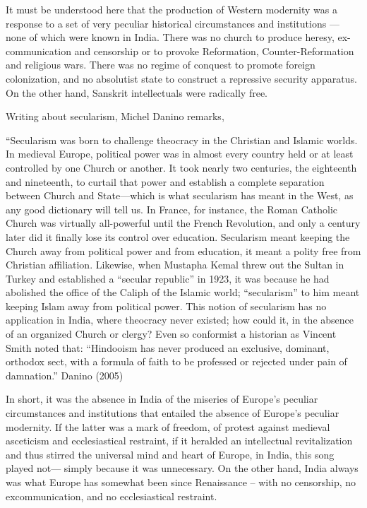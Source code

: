 It must be understood here that the production of Western modernity was a response to a set of very peculiar historical circumstances and institutions — none of which were known in India. There was no church to produce heresy, ex-communication and censorship or to provoke Reformation, Counter-Reformation and religious wars. There was no regime of conquest to promote foreign colonization, and no absolutist state to construct a repressive security apparatus. On the other hand, Sanskrit intellectuals were {\rm radically free}. 

Writing about secularism, Michel Danino remarks,
\begin{myquote}
“Secularism was born to challenge theocracy in the Christian and Islamic worlds. In medieval Europe, political power was in almost every country held or at least controlled by one Church or another. It took nearly two centuries, the eighteenth and nineteenth, to curtail that power and establish a complete separation between Church and State—which is what secularism has meant in the West, as any good dictionary will tell us. In France, for instance, the Roman Catholic Church was virtually all-powerful until the French Revolution, and only a century later did it finally lose its control over education. Secularism meant keeping the Church away from political power and from education, it meant a polity free from Christian affiliation. Likewise, when Mustapha Kemal threw out the Sultan in Turkey and established a “secular republic” in 1923, it was because he had abolished the office of the Caliph of the Islamic world; “secularism” to him meant keeping Islam away from political power.  This notion of secularism has no application in India, where theocracy never existed; how could it, in the absence of an organized Church or
clergy? Even so conformist a historian as Vincent Smith noted that: “Hindooism has never produced an exclusive, dominant, orthodox sect, with a formula of faith to be professed or rejected under pain of damnation.”	\hfill{Danino (2005)}
\end{myquote}

In short, it was the absence in India of the miseries of Europe’s peculiar circumstances and institutions that entailed the absence of Europe’s peculiar modernity. If the latter was a mark of freedom, of protest against medieval asceticism and ecclesiastical restraint, if it heralded an intellectual revitalization and thus stirred the universal mind and heart of Europe, in India, this song played not— simply because it was unnecessary. On the other hand, India always was what Europe has somewhat been since Renaissance – with no censorship, no excommunication, and no ecclesiastical restraint.

